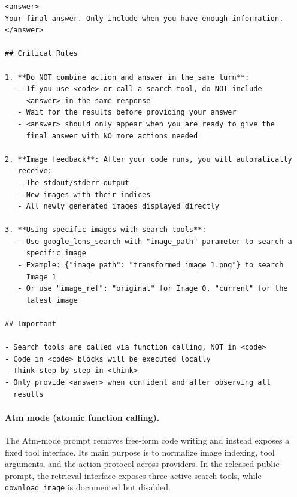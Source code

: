 \documentclass[runningheads]{llncs}
\theoremstyle{plain}
\theoremstyle{definition}
\theoremstyle{remark}
\begin{document}
\begin{tcolorbox}
\begin{verbatim}
<answer>
Your final answer. Only include when you have enough information.
</answer>

## Critical Rules

1. **Do NOT combine action and answer in the same turn**:
   - If you use <code> or call a search tool, do NOT include
     <answer> in the same response
   - Wait for the results before providing your answer
   - <answer> should only appear when you are ready to give the
     final answer with NO more actions needed

2. **Image feedback**: After your code runs, you will automatically
   receive:
   - The stdout/stderr output
   - New images with their indices
   - All newly generated images displayed directly

3. **Using specific images with search tools**:
   - Use google_lens_search with "image_path" parameter to search a
     specific image
   - Example: {"image_path": "transformed_image_1.png"} to search
     Image 1
   - Or use "image_ref": "original" for Image 0, "current" for the
     latest image

## Important

- Search tools are called via function calling, NOT in <code>
- Code in <code> blocks will be executed locally
- Think step by step in <think>
- Only provide <answer> when confident and after observing all
  results
\end{verbatim}
\end{tcolorbox}

\paragraph{Atm mode (atomic function calling).}
The Atm-mode prompt removes free-form code writing and instead exposes a fixed tool interface. 
Its main purpose is to normalize image indexing, tool arguments, and the action protocol across providers. 
In the released public prompt, the retrieval interface exposes three active search tools, while \texttt{download\_image} is documented but disabled.
\end{document}
